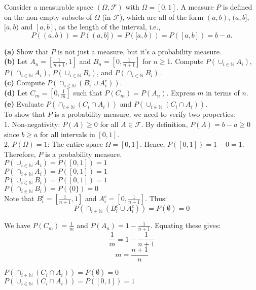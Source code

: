 \begin{example}
    Consider a measurable space $(\Omega, \mathcal{F})$ with $\Omega = [0, 1]$. A measure $P$ is defined on the non-empty subsets of $\Omega$ (in $\mathcal{F}$), which are all of the form $(a, b)$, $(a, b]$, $[a, b)$ and $[a, b]$, as the length of the interval, i.e.,
\[
P((a, b)) = P((a, b]) = P([a, b)) = P([a, b]) = b - a.
\]

\textbf{(a)} Show that $P$ is not just a measure, but it's a probability measure.\\
\textbf{(b)} Let $A_n = \left[ \frac{1}{n+1}, 1 \right]$ and $B_n = \left[ 0, \frac{1}{n+1} \right]$ for $n \geq 1$. Compute $P\left(\cup_{i \in \mathbb{N}} A_i\right)$, $P\left(\cap_{i \in \mathbb{N}} A_i\right)$, $P\left(\cup_{i \in \mathbb{N}} B_i\right)$, and $P\left(\cap_{i \in \mathbb{N}} B_i\right)$.\\
\textbf{(c)} Compute $P\left(\cap_{i \in \mathbb{N}} (B_i^c \cup A_i^c)\right)$.\\
\textbf{(d)} Let $C_m = \left[0, \frac{1}{m}\right]$ such that $P(C_m) = P(A_n)$. Express $m$ in terms of $n$.\\
\textbf{(e)} Evaluate $P\left(\cap_{i \in \mathbb{N}} (C_i \cap A_i)\right)$ and $P\left(\cup_{i \in \mathbb{N}} (C_i \cap A_i)\right)$.\\

To show that $P$ is a probability measure, we need to verify two properties:\\

1. Non-negativity: $P(A) \geq 0$ for all $A \in \mathcal{F}$. By definition, $P(A) = b - a \geq 0$ since $b \geq a$ for all intervals in $[0, 1]$.\\

2. $P(\Omega) = 1$: The entire space $\Omega = [0, 1]$. Hence, $P([0, 1]) = 1 - 0 = 1$.\\

Therefore, $P$ is a probability measure.\\

$P\left(\cup_{i \in \mathbb{N}} A_i\right) = P([0, 1]) = 1$\\
$P\left(\cap_{i \in \mathbb{N}} A_i\right) = P\left([0, 1]\right) = 1$\\
$P\left(\cup_{i \in \mathbb{N}} B_i\right) = P([0, 1]) = 1$\\
$P\left(\cap_{i \in \mathbb{N}} B_i\right) = P(\{0\}) = 0$\\

Note that $B_i^c = [\frac{1}{n+1}, 1]$ and $A_i^c = [0, \frac{1}{n+1}]$. Thus:
\[
P\left(\cap_{i \in \mathbb{N}} (B_i^c \cup A_i^c)\right) = P(\emptyset) = 0
\]

We have $P(C_m) = \frac{1}{m}$ and $P(A_n) = 1 - \frac{1}{n+1}$. Equating these gives:
\[
\frac{1}{m} = 1 - \frac{1}{n+1}
\]
\[
m = \frac{n+1}{n}
\]


$P\left(\cap_{i \in \mathbb{N}} (C_i \cap A_i)\right) = P(\emptyset) = 0$\\
$P\left(\cup_{i \in \mathbb{N}} (C_i \cap A_i)\right) = P([0, 1]) = 1$\\

\end{example}